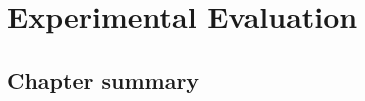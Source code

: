 \chapter{Experimental Evaluation}\label{chapter:experimental_evaluation}

\section{Chapter summary}
